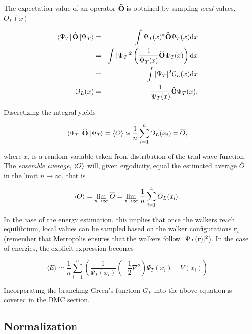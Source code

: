 The expectation value of an operator ${\bf\widehat{O}}$ is obtained by sampling \textit{local} values, $O_L(x)$

\begin{eqnarray}
 \left< \Psi_T \right|{\bf\widehat{O}}\left| \Psi_T \right> &=& \int \Psi_T(x)^\ast {\bf\widehat{O}} \Psi_T(x)\mathrm{d}x \nonumber\\
                                &=& \int |\Psi_T|^2\left(\frac{1}{\Psi_T(x)}{\bf\widehat{O}}\Psi_T(x)\right)\mathrm{d}x \nonumber\\
                                &=& \int |\Psi_T|^2 O_L(x)\mathrm{d}x \\
                         O_L(x) &=& \frac{1}{\Psi_T(x)}{\bf\widehat{O}}\Psi_T(x).           
\end{eqnarray}

Discretizing the integral yields 

\begin{equation}
 \left< \Psi_T \right|{\bf\widehat{O}}\left| \Psi_T \right> \equiv \left< O \right> \simeq \frac{1}{n}\sum_{i=1}^n O_L(x_i) \equiv \overline{O},
\end{equation}

where $x_i$ is a random variable taken from distribution of the trial wave function. The \textit{ensemble average},  $\left< O \right>$ will, given ergodicity, equal the estimated average $\overline{O}$ in the limit $n\rightarrow\infty$, that is

\begin{equation}
 \label{eq:MeanVStrueExp}
 \left< O \right> = \lim_{n\to\infty} \overline{O} = \lim_{n\to\infty}\frac{1}{n}\sum_{i=1}^n O_L(x_i).
\end{equation}


In the case of the energy estimation, this implies that once the walkers reach equilibrium, local values can be sampled based on the walker configurations $\mathbf{r}_i$ (remember that Metropolis ensures that the walkers follow $|\Psi_T(\mathbf{r})|^2$). In the case of energies, the explicit expression becomes

\begin{equation}
 \langle E \rangle \simeq \frac{1}{n}\sum_{i=1}^n \left(\frac{1}{\Psi_T(x_i)}\left(-\frac{1}{2}\nabla^2\right)\Psi_T(x_i) + V(x_i)\right)
\end{equation}

Incorporating the branching Green's function $G_B$ into the above equation is covered in the DMC section.

\subsection{Normalization}

